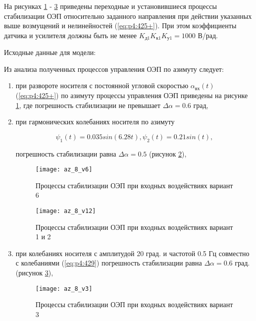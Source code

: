 На рисунках \ref{fig:az31} - \ref{fig:az33} приведены переходные и установившиеся процессы стабилизации ОЭП относительно заданного направления при действии указанных выше возмущений и нелинейностей (\ref{eq:p4:425+}). При этом коэффициенты датчика и усилителя должны быть не менее $K_{\textit{д1}} K_{\textit{к1}} K_{\textit{у1}} = 1000$ В/рад.

Исходные данные для модели:

\begingroup
\captiondelim{ } %

\endgroup

Из анализа полученных процессов управления ОЭП по азимуту следует:

\begin{enumerate}
	\item при развороте носителя с постоянной угловой скоростью  $\alpha_{\textit{вх}}(t)$ (\ref{eq:p4:425+}) по азимуту процессы управления ОЭП приведены на рисунке \ref{fig:az31}, где погрешность стабилизации не превышает  $\varDelta\alpha=0.6$ град,
	\item при гармонических колебаниях носителя по азимуту
	
	\begin{equation}
	\label{eq:p4:429}
	\psi_{1}(t)=0.035sin(6.28t),\psi_{2}(t)=0.21sin(t),
	\end{equation}
	
	погрешность стабилизации равна $\varDelta\alpha=0.5$ (рисунок \ref{fig:az32}),
	
	\begin{figure}[ht]
		\centering
		\texttt{[image: az\_8\_v6]} 
		\caption{Процессы стабилизации ОЭП при входных воздействиях  вариант 6}
		\label{fig:az31}
	\end{figure} 
		
	\begin{figure}[ht]
		\centering
		\texttt{[image: az\_8\_v12]} 
		\caption{Процессы стабилизации ОЭП при входных воздействиях  вариант 1 и 2}
		\label{fig:az32}
	\end{figure} 

	
	\item при колебаниях носителя с амплитудой 20 град. и частотой 0.5 Гц  совместно с колебаниями (\ref{eq:p4:429}) погрешность стабилизации равна   $\varDelta\alpha=0.6$ град. (рисунок \ref{fig:az33}),
	
	\begin{figure}[ht]
		\centering
		\texttt{[image: az\_8\_v3]} 
		\caption{Процессы стабилизации ОЭП при входных воздействиях  вариант 3}
		\label{fig:az33}
	\end{figure}
 

\end{enumerate}
